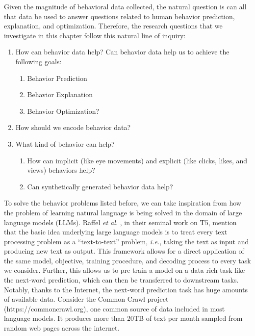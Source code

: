 Given the magnitude of behavioral data collected, the natural question is can all that data be used to answer questions related to human behavior prediction, explanation, and optimization. Therefore, the research questions that we investigate in this chapter follow this natural line of inquiry:
\begin{enumerate}
    \item How can behavior data help? Can behavior data help us to achieve the following goals:
        \begin{enumerate}
            \item Behavior Prediction
            \item Behavior Explanation
            \item Behavior Optimization?
        \end{enumerate}
    
    \item How should we encode behavior data? 

    \item What kind of behavior can help?
    \begin{enumerate}
        \item How can implicit (like eye movements) and explicit (like clicks, likes, and views) behaviors help? 
        \item Can synthetically generated behavior data help?
    \end{enumerate}
    
\end{enumerate}


To solve the behavior problems listed before, we can take inspiration from how the problem of learning natural language is being solved in the domain of large language models (LLMs). Raffel \textit{et al.} \cite{raffel2020exploring}, in their seminal work on T5, mention that the basic idea underlying large language models is to treat every text processing problem as a ``text-to-text'' problem, \textit{i.e.}, taking the text as input and producing new text as output. This framework allows for a direct application of the same model, objective, training procedure, and decoding process to every task we consider. Further, this allows us to pre-train a model on a data-rich task like the next-word prediction, which can then be transferred to downstream tasks. Notably, thanks to the Internet, the next-word prediction task has huge amounts of available data. Consider the Common Crawl project (https://commoncrawl.org), one common source of data included in most language models. It produces more than 20TB of text per month sampled from random web pages across the internet. 



